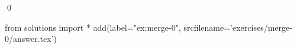 
\begin{ex} 
  \label{ex:merge-0}
  
  \qed
\end{ex} 
\begin{python0}
from solutions import *
add(label="ex:merge-0",
    srcfilename='exercises/merge-0/answer.tex') 
\end{python0}
